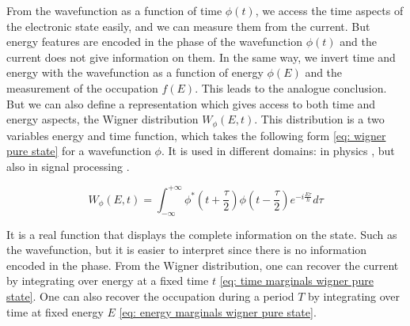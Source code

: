 From the wavefunction as a function of time $\phi\left(t\right)$, we access the time aspects of the electronic state easily, and we can measure them from the current.
But energy features are encoded in the phase of the wavefunction $\phi\left(t\right)$ and the current does not give information on them.
In the same way, we invert time and energy with the wavefunction as a function of energy $\phi\left(E\right)$ and the measurement of the occupation $f\left(E\right)$.
This leads to the analogue conclusion.
But we can also define a representation which gives access to both time and energy aspects, the Wigner distribution $W_{\phi}\left(E,t\right)$.
This distribution is a two variables energy and time function, which takes the following form \eqref{eq: wigner pure state} for a wavefunction $\phi$.
It is used in different domains: in physics \cite{wigner1997on,haroche2006exploring}, but also in signal processing \cite{ville1948theorie,flandrin1998time,mallat1999wavelet}.

\begin{equation}
W_{\phi}\left(E,t\right) = \int_{-\infty}^{+\infty} \phi^{\ast}\left(t+\frac{\tau}{2}\right)\phi\left(t-\frac{\tau}{2}\right) e^{-i\frac{E\tau}{\hbar}} d\tau \label{eq: wigner pure state}
\end{equation}

It is a real function that displays the complete information on the state.
Such as the wavefunction, but it is easier to interpret since there is no information encoded in the phase.
From the Wigner distribution, one can recover the current by integrating over energy at a fixed time $t$ \eqref{eq: time marginals wigner pure state}.
One can also recover the occupation during a period $T$ by integrating over time at fixed energy $E$ \eqref{eq: energy marginals wigner pure state}.

